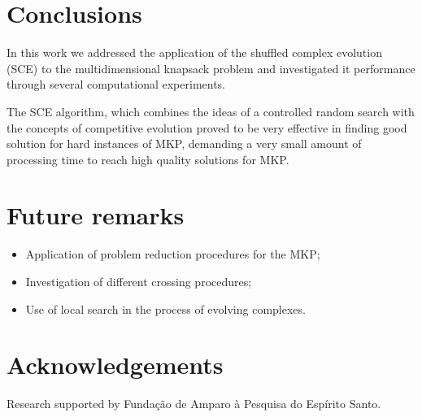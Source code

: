 \documentclass[a0,portrait]{a0poster}
\begin{document}
\begin{multicols}{2}
\color{SaddleBrown} %

\section*{Conclusions}

In this work we addressed the application of the shuffled complex
evolution (SCE) to the multidimensional knapsack problem and investigated it
performance through several computational experiments.

The SCE algorithm, which combines the ideas of a controlled random search with
the concepts of competitive evolution proved to be very effective in finding
good solution for hard instances of MKP, demanding a very small amount of
processing time to reach high quality solutions for MKP.

\color{DarkSlateGray} %


\section*{Future remarks}
\begin{itemize}
	\item Application of problem reduction procedures for the MKP;
	\item Investigation of different crossing procedures;
	\item Use of local search in the process of evolving complexes.
\end{itemize}




\section*{Acknowledgements}
Research supported by Funda\c c\~ao de Amparo \`a Pesquisa do Esp\'irito Santo.

\end{multicols}
\end{document}
